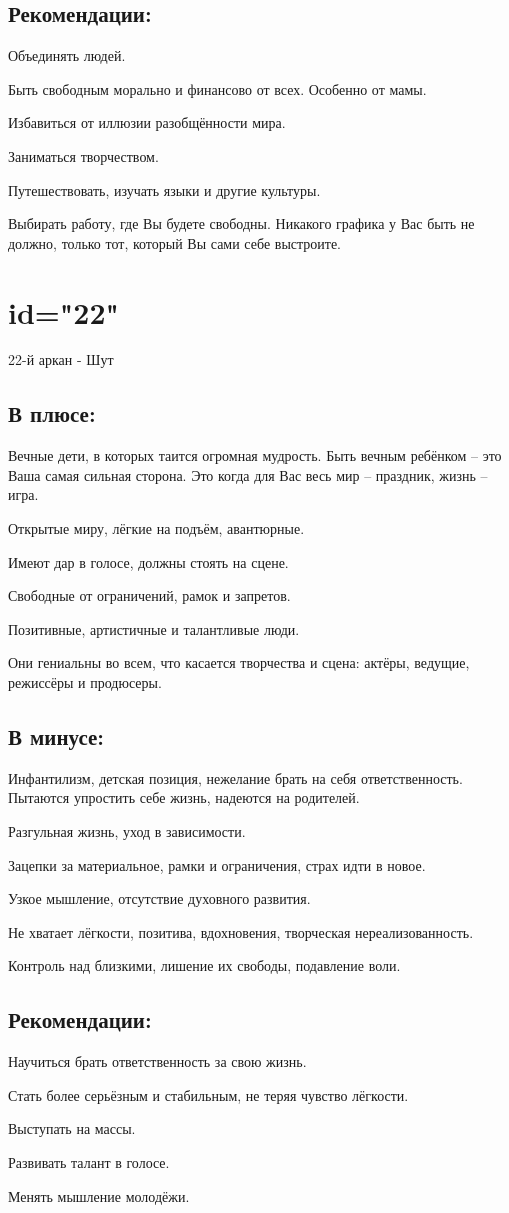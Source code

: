 \subsection{Рекомендации:}
\item Объединять людей.
\item Быть свободным морально и финансово от всех. Особенно от мамы.
\item Избавиться от иллюзии разобщённости мира.
\item Заниматься творчеством.
\item Путешествовать, изучать языки и другие культуры.
\item Выбирать работу, где Вы будете свободны. Никакого графика у Вас быть не должно, только тот, который Вы сами себе выстроите.
\endsubsection

\endsection

\section{id="22"}{22-й аркан - Шут}

\subsection{В плюсе:}
\item Вечные дети, в которых таится огромная мудрость. Быть вечным ребёнком – это Ваша самая сильная сторона. Это когда для Вас весь мир – праздник, жизнь – игра.
\item Открытые миру, лёгкие на подъём, авантюрные.
\item Имеют дар в голосе, должны стоять на сцене.
\item Свободные от ограничений, рамок и запретов.
\item Позитивные, артистичные и талантливые люди.
\item Они гениальны во всем, что касается творчества и сцена: актёры, ведущие, режиссёры и продюсеры.
\endsubsection

\subsection{В минусе:}
\item Инфантилизм, детская позиция, нежелание брать на себя ответственность. Пытаются упростить себе жизнь, надеются на родителей.
\item Разгульная жизнь, уход в зависимости.
\item Зацепки за материальное, рамки и ограничения, страх идти в новое.
\item Узкое мышление, отсутствие духовного развития.
\item Не хватает лёгкости, позитива, вдохновения, творческая нереализованность.
\item Контроль над близкими, лишение их свободы, подавление воли.
\endsubsection

\subsection{Рекомендации:}
\item Научиться брать ответственность за свою жизнь.
\item Стать более серьёзным и стабильным, не теряя чувство лёгкости.
\item Выступать на массы.
\item Развивать талант в голосе.
\item Менять мышление молодёжи.
\endsubsection

\endsection
